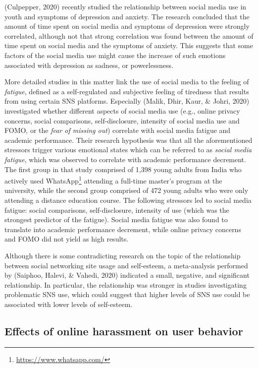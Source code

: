 \documentclass[
  10pt,
  dvipsnames]{scrartcl}
\begin{document}
(Culpepper, 2020) recently studied the relationship between social media
use in youth and symptoms of depression and anxiety. The research
concluded that the amount of time spent on social media and symptoms of
depression were strongly correlated, although not that strong
correlation was found between the amount of time spent on social media
and the symptoms of anxiety. This suggests that some factors of the
social media use might cause the increase of such emotions associated
with depression as sadness, or powerlessness.

More detailed studies in this matter link the use of social media to the
feeling of \textit{fatigue}, defined as a self-regulated and subjective
feeling of tiredness that results from using certain SNS platforms.
Especially (Malik, Dhir, Kaur, \& Johri, 2020) investigated whether
different aspects of social media use (e.g., online privacy concerns,
social comparisons, self-disclosure, intensity of social media use and
FOMO, or the \textit{fear of missing out}) correlate with social media
fatigue and academic performance. Their research hypothesis was that all
the aforementioned stressors trigger various emotional states which can
be referred to as \textit{social media fatigue}, which was observed to
correlate with academic performance decrement. The first group in that
study comprised of 1,398 young adults from India who actively used
WhatsApp\footnote{\url{https://www.whatsapp.com/}} attending a full-time
master's program at the university, while the second group comprised of
472 young adults who were only attending a distance education course.
The following stressors led to social media fatigue: social comparisons,
self-disclosure, intensity of use (which was the strongest predictor of
the fatigue). Social media fatigue was also found to translate into
academic performance decrement, while online privacy concerns and FOMO
did not yield as high results.

Although there is some contradicting research on the topic of the
relationship between social networking site usage and self-esteem, a
meta-analysis performed by (Saiphoo, Halevi, \& Vahedi, 2020) indicated
a small, negative, and significant relationship. In particular, the
relationship was stronger in studies investigating problematic SNS use,
which could suggest that higher levels of SNS use could be associated
with lower levels of self-esteem.

\subsection{Effects of online harassment on user behavior}
\end{document}
